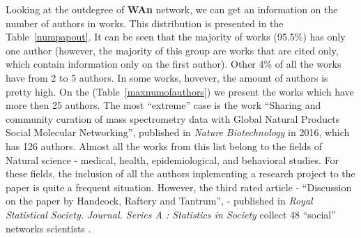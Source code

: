 \documentclass[11pt]{article} %
\newcommand{\Remark}[1]{\ifodd\value{page} \normalmarginpar
 \else \reversemarginpar \fi \marginpar{{\footnotesize #1}} }
\begin{document}
Looking at the outdegree of \textbf{WAn} network, we can get an information on the number of authors in works. This distribution is presented in the Table~\ref{numpapout}. It can be seen that the majority of works (95.5\%) has only one author (however, the majority of this group are works that are cited only, which contain information only on the first author). Other 4\% of all the works have from 2 to 5 authors. In some works, hovever, the amount of authors is pretty high. On the (Table~\ref{maxnumofauthors}) we present the works which have more then 25 authors. The most ``extreme'' case is the work ``Sharing and community curation of mass spectrometry data with Global Natural Products Social Molecular Networking'', published in \textit{Nature Biotechnology} in 2016, which has 126 authors. Almost all the works from this list belong to the fields of Natural science - medical, health, epidemiological, and behavioral studies. For these fields, the inclusion of all the authors inplementing a research project to the paper is quite a frequent situation.  However, the third rated article - ``Discussion on the paper by Handcock, Raftery and Tantrum'', - published in \textit{Royal Statistical Society. Journal. Series A : Statistics in Society} collect 48 ``social'' networks scientists \Remark{remove Table 6?}.\medskip
\end{document}

